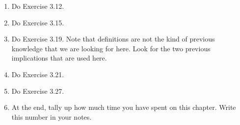 \begin{enumerate}
\item Do Exercise 3.12.

\item Do Exercise 3.15.

\item Do Exercise 3.19.
Note that definitions are not the kind of previous knowledge that we are looking for here.
Look for the two previous implications that are used here.

\item Do Exercise 3.21.

\item Do Exercise 3.27.


\item At the end, tally up how much time you have spent on this chapter.
Write this number in your notes.
\end{enumerate}

